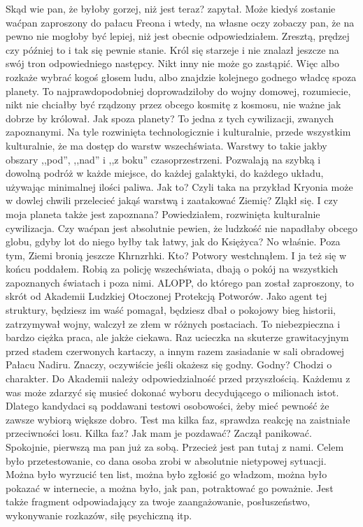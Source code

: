 \begin{dialogue}
\ds{} Skąd wie pan, że byłoby gorzej, niż jest teraz? \dm{} zapytał.
\ds{} Może kiedyś zostanie waćpan zaproszony do pałacu Freona i wtedy, na własne oczy zobaczy pan, że na pewno nie mogłoby być lepiej, niż jest obecnie \dm{} odpowiedziałem. \dm{}
Zresztą, prędzej czy później to i tak się pewnie stanie. Król się starzeje i nie znalazł jeszcze na swój tron odpowiedniego następcy. Nikt inny nie może go zastąpić.
Więc albo rozkaże wybrać kogoś głosem ludu, albo znajdzie kolejnego godnego władcę spoza planety. 
To najprawdopodobniej doprowadziłoby do wojny domowej, rozumiecie, nikt nie chciałby być rządzony przez obcego kosmitę z kosmosu, nie ważne jak dobrze by królował.
\ds{} Jak spoza planety? 
\ds{} To jedna z tych cywilizacji, zwanych zapoznanymi. Na tyle rozwinięta technologicznie i kulturalnie, przede wszystkim kulturalnie, 
że ma dostęp do warstw wszechświata. Warstwy to takie jakby obszary ,,pod'', ,,nad'' i ,,z boku'' czasoprzestrzeni.
Pozwalają na szybką i dowolną podróż w każde miejsce, do każdej galaktyki, do każdego układu, używając minimalnej ilości paliwa.
\ds{} Jak to? Czyli taka na przykład Kryonia może w dowlej chwili przelecieć jakąś warstwą i zaatakować Ziemię? 
\dm{} Zląkł się. \dm{} I czy moja planeta także jest zapoznana?
\ds{} Powiedziałem, rozwinięta kulturalnie cywilizacja. Czy waćpan jest absolutnie pewien, że ludzkość nie napadłaby obcego globu, gdyby lot do niego byłby tak łatwy, jak do Księżyca?
No właśnie. Poza tym, Ziemi bronią jeszcze Khrnzrhki.
\ds{} Kto? 
\ds{} Potwory \dm{} westchnąłem. I ja też się w końcu poddałem. \dm{} Robią za policję wszechświata, dbają o pokój na wszystkich zapoznanych światach i poza nimi. 
ALOPP, do którego pan został zaproszony, to skrót od Akademii Ludzkiej Otoczonej Protekcją Potworów. 
Jako agent tej struktury, będziesz im waść pomagał, będziesz dbał o pokojowy bieg historii, zatrzymywał wojny, walczył ze złem w różnych postaciach. 
To niebezpieczna i bardzo ciężka praca, ale jakże ciekawa.
Raz ucieczka na skuterze grawitacyjnym przed stadem czerwonych kartaczy, a innym razem zasiadanie w sali obradowej Pałacu Nadiru. 
Znaczy, oczywiście jeśli okażesz się godny.
\ds{} Godny?
\ds{} Chodzi o charakter. Do Akademii należy odpowiedzialność przed przyszłością. 
Każdemu z was może zdarzyć się musieć dokonać wyboru decydującego o milionach istot. 
Dlatego kandydaci są poddawani testowi osobowości, żeby mieć pewność że zawsze wybiorą większe dobro. 
Test ma kilka faz, sprawdza reakcję na zaistniałe przeciwności losu.
\ds{} Kilka faz? Jak mam je pozdawać? \dm{} Zaczął panikować.
\ds{} Spokojnie, pierwszą ma pan już za sobą. Przecież jest pan tutaj z nami. 
Celem było przetestowanie, co dana osoba zrobi w absolutnie nietypowej sytuacji.
Można było wyrzucić ten list, można było zgłosić go władzom, można było pokazać w internecie, a można było, jak pan, potraktować go poważnie.
Jest także fragment odpowiadający za twoje zaangażowanie, posłuszeństwo, wykonywanie rozkazów, siłę psychiczną itp.
\end{dialogue}

